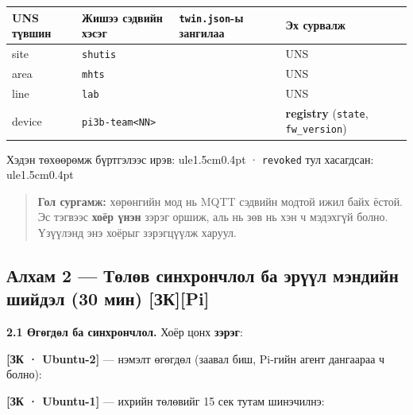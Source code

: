 \begingroup\scriptsize\begin{longtable}[]{@{}llll@{}}
\toprule
UNS түвшин & Жишээ сэдвийн хэсэг & \texttt{twin.json}-ы зангилаа & Эх сурвалж\tabularnewline
\midrule
\endhead
site & \texttt{shutis} & & UNS\tabularnewline
area & \texttt{mhts} & & UNS\tabularnewline
line & \texttt{lab} & & UNS\tabularnewline
device & \texttt{pi3b-team\textless{}NN\textgreater{}} & & \textbf{registry} (\texttt{state}, \texttt{fw\_version})\tabularnewline
\bottomrule
\end{longtable}\endgroup

Хэдэн төхөөрөмж бүртгэлээс ирэв: ule{1.5cm}{0.4pt} · \texttt{revoked} тул хасагдсан: ule{1.5cm}{0.4pt}

\begin{quote}
\textbf{Гол сургамж:} хөрөнгийн мод нь MQTT сэдвийн модтой ижил байх ёстой. Эс тэгвээс \textbf{хоёр үнэн} зэрэг оршиж, аль нь зөв нь хэн ч мэдэхгүй болно. Үзүүлэнд энэ хоёрыг зэрэгцүүлж харуул.
\end{quote}

\hypertarget{ux430ux43bux445ux430ux43c-2-ux442ux4e9ux43bux4e9ux432-ux441ux438ux43dux445ux440ux43eux43dux447ux43bux43eux43b-ux431ux430-ux44dux440ux4afux4afux43b-ux43cux44dux43dux434ux438ux439ux43d-ux448ux438ux439ux434ux44dux43b-30-ux43cux438ux43d-ux437ux43api}{%
\subsection{Алхам 2 --- Төлөв синхрончлол ба эрүүл мэндийн шийдэл (30 мин) {[}ЗК{]}{[}Pi{]}}\label{ux430ux43bux445ux430ux43c-2-ux442ux4e9ux43bux4e9ux432-ux441ux438ux43dux445ux440ux43eux43dux447ux43bux43eux43b-ux431ux430-ux44dux440ux4afux4afux43b-ux43cux44dux43dux434ux438ux439ux43d-ux448ux438ux439ux434ux44dux43b-30-ux43cux438ux43d-ux437ux43api}}

\textbf{2.1 Өгөгдөл ба синхрончлол.} Хоёр цонх \textbf{зэрэг}:

\textbf{{[}ЗК · Ubuntu-2{]}} --- нэмэлт өгөгдөл (заавал биш, Pi-гийн агент дангаараа ч болно):

\begin{Shaded}
\begin{Highlighting}[]
\end{Highlighting}
\end{Shaded}

\textbf{{[}ЗК · Ubuntu-1{]}} --- ихрийн төлөвийг 15 сек тутам шинэчилнэ:

